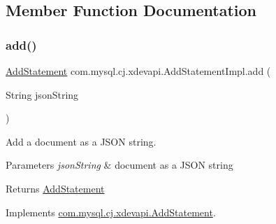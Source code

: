 \subsection{Member Function Documentation}
\mbox{\label{classcom_1_1mysql_1_1cj_1_1xdevapi_1_1_add_statement_impl_abba297ed8c7bfb2afad21bebcb3ca13a}} 
\subsubsection{\texorpdfstring{add()}{add()}\hspace{0.1cm}{\footnotesize\ttfamily [1/2]}}
{\footnotesize\ttfamily \mbox{\hyperlink{interfacecom_1_1mysql_1_1cj_1_1xdevapi_1_1_add_statement}{Add\+Statement}} com.\+mysql.\+cj.\+xdevapi.\+Add\+Statement\+Impl.\+add (\begin{DoxyParamCaption}\item[{String}]{json\+String }\end{DoxyParamCaption})}

Add a document as a J\+S\+ON string.


\begin{DoxyParams}{Parameters}
{\em json\+String} & document as a J\+S\+ON string \\
\hline
\end{DoxyParams}
\begin{DoxyReturn}{Returns}
\mbox{\hyperlink{interfacecom_1_1mysql_1_1cj_1_1xdevapi_1_1_add_statement}{Add\+Statement}} 
\end{DoxyReturn}


Implements \mbox{\hyperlink{interfacecom_1_1mysql_1_1cj_1_1xdevapi_1_1_add_statement_a74f363f3bc32c51f83c4ae69722b179c}{com.\+mysql.\+cj.\+xdevapi.\+Add\+Statement}}.

\mbox{\label{classcom_1_1mysql_1_1cj_1_1xdevapi_1_1_add_statement_impl_a59bdfcc8a26ee55966f9a1ad5a7b2303}} 
